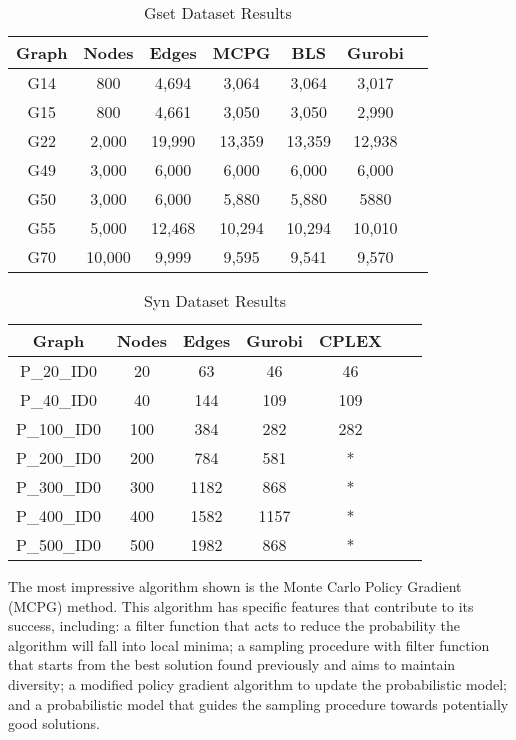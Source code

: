 \documentclass[conference]{IEEEtran}
\begin{document}
\begin{table}[htbp]
\caption{Gset Dataset Results}
\begin{center}
\begin{tabular}{|c|c|c|c|c|c|c|}
\hline
\textbf{Graph} & \textbf{Nodes} & \textbf{Edges} & \textbf{MCPG} & \textbf{BLS} & \textbf{Gurobi} \\
\hline 
G14 & 800& 4,694& 3,064 &3,064 & 3,017\\
\hline
G15 & 800& 4,661& 3,050 & 3,050 & 2,990\\
\hline
G22 & 2,000& 19,990& 13,359 &13,359 & 12,938\\
\hline
G49 & 3,000& 6,000& 6,000 &6,000 & 6,000\\
\hline
G50 & 3,000& 6,000& 5,880 &5,880 & 5880\\
\hline
G55 & 5,000& 12,468& 10,294 &10,294 & 10,010\\
\hline
G70 & 10,000& 9,999 & 9,595 &9,541 & 9,570\\
\hline
\end{tabular}
\label{tab1}
\end{center}
\end{table}
\begin{table}[htbp]
\caption{Syn Dataset Results}
\begin{center}
\begin{tabular}{|c|c|c|c|c|c|c|}
\hline
\textbf{Graph} & \textbf{Nodes} & \textbf{Edges} & \textbf{Gurobi} & \textbf{CPLEX} \\
\hline 
P\_20\_ID0 & 20 & 63 & 46 & 46 \\
\hline
P\_40\_ID0 & 40 & 144& 109 & 109\\
\hline
P\_100\_ID0 & 100 & 384 & 282 & 282 \\
\hline
P\_200\_ID0 & 200 & 784 & 581 & * \\
\hline
P\_300\_ID0 & 300 & 1182 & 868 & * \\
\hline
P\_400\_ID0 & 400 & 1582 & 1157 & * \\
\hline
P\_500\_ID0 & 500 & 1982 & 868 & * \\
\hline
\end{tabular}
\label{tab1}
\end{center}
\end{table}

The most impressive algorithm shown is the Monte Carlo Policy Gradient (MCPG) method. This algorithm has specific features that contribute to its success, including: a filter function that acts to reduce the probability the algorithm will fall into local minima; a sampling procedure with filter function that starts from the best solution found previously and aims to maintain diversity; a modified policy gradient algorithm to update the probabilistic model; and a probabilistic model that guides the sampling procedure towards potentially good solutions.
\end{document}
